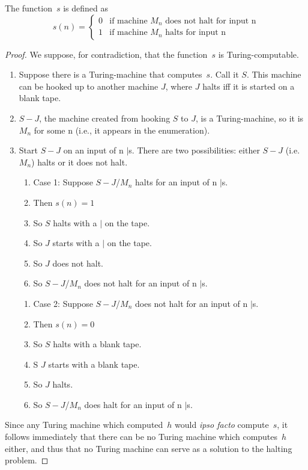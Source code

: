 \documentclass[../../include/open-logic-section]{subfiles}
\begin{document}
\begin{defn} The function~$s$ is defined as
\[
s(n) =
\begin{cases}
  \text{0} & \text{if machine~$M_n$ does not halt for input n} \\
  \text{1} & \text{if machine~$M_n$ halts for input n}
\end{cases}
\]
\end{defn}

\begin{proof}
We suppose, for contradiction, that the function~$s$ is Turing-computable.
\begin{enumerate}
\item Suppose there is a Turing-machine that computes~$s$. Call it $S$.
This machine can be hooked up to another machine $J$, where $J$ halts iff
it is started on a blank tape.
\item $S-J$, the machine created from hooking $S$ to $J$, is a
Turing-machine, so it is $M_n$ for some n (i.e., it appears in the
enumeration).
\item Start $S-J$ on an input of n $\mid$s. There are two possibilities:
either $S-J$ (i.e. $M_n$) halts or it does not halt.
\begin{enumerate}
	\item Case 1: Suppose $S-J$/$M_n$ halts for an input of n $\mid$s.
	\item Then $s(n) = 1$
	\item So $S$ halts with a $\mid$ on the tape.
	\item So $J$ starts with a $\mid$ on the tape.
	\item So $J$ does not halt.
	\item So $S-J$/$M_n$ does not halt for an input of n $\mid$s.
\end{enumerate}
\begin{enumerate}
\item Case 2: Suppose $S-J$/$M_n$ does not halt for an input of n $\mid$s.	\item Then $s(n) = 0$
	\item So $S$ halts with a blank tape.
	\item S $J$ starts with a blank tape.
	\item So $J$ halts.
	\item So $S-J$/$M_n$ does halt for an input of n $\mid$s.
\end{enumerate}
\end{enumerate}

Since any Turing machine which computed~$h$ would \emph{ipso facto}
compute~$s$, it follows immediately that there can be no Turing machine
which computes~$h$ either, and thus that no Turing machine can serve as a
solution to the halting problem.
\end{proof}
\end{document}
